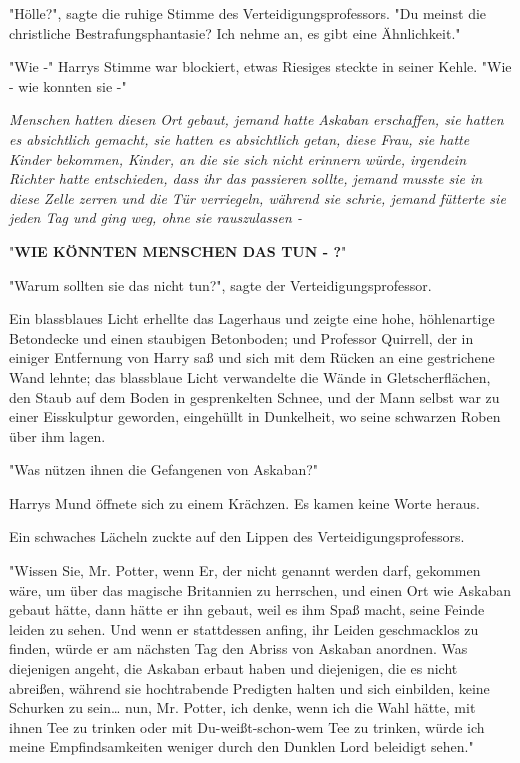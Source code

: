 {"Hölle?", sagte die ruhige Stimme des Verteidigungsprofessors. "Du meinst die christliche Bestrafungsphantasie? Ich nehme an, es gibt eine Ähnlichkeit."

"Wie -" Harrys Stimme war blockiert, etwas Riesiges steckte in seiner Kehle. "Wie - wie konnten sie -"

\emph{Menschen hatten diesen Ort gebaut, jemand hatte Askaban erschaffen, sie hatten es absichtlich gemacht, sie hatten es absichtlich getan, diese Frau, sie hatte Kinder bekommen, Kinder, an die sie sich nicht erinnern würde, irgendein Richter hatte} \emph{entschieden, dass ihr das passieren sollte, jemand musste sie in diese Zelle zerren und die Tür verriegeln, während sie schrie, jemand fütterte sie} \emph{jeden Tag und ging weg, ohne sie rauszulassen -}

"\textbf{WIE KÖNNTEN MENSCHEN DAS TUN - ?}"

"Warum sollten sie das nicht tun?", sagte der Verteidigungsprofessor.

Ein blassblaues Licht erhellte das Lagerhaus und zeigte eine hohe, höhlenartige Betondecke und einen staubigen Betonboden; und Professor Quirrell, der in einiger Entfernung von Harry saß und sich mit dem Rücken an eine gestrichene Wand lehnte; das blassblaue Licht verwandelte die Wände in Gletscherflächen, den Staub auf dem Boden in gesprenkelten Schnee, und der Mann selbst war zu einer Eisskulptur geworden, eingehüllt in Dunkelheit, wo seine schwarzen Roben über ihm lagen.

"Was nützen ihnen die Gefangenen von Askaban?"

Harrys Mund öffnete sich zu einem Krächzen. Es kamen keine Worte heraus.

Ein schwaches Lächeln zuckte auf den Lippen des Verteidigungsprofessors.

"Wissen Sie, Mr. Potter, wenn Er, der nicht genannt werden darf, gekommen wäre, um über das magische Britannien zu herrschen, und einen Ort wie Askaban gebaut hätte, dann hätte er ihn gebaut, weil es ihm Spaß macht, seine Feinde leiden zu sehen. Und wenn er stattdessen anfing, ihr Leiden geschmacklos zu finden, würde er am nächsten Tag den Abriss von Askaban anordnen. Was diejenigen angeht, die Askaban erbaut haben und diejenigen, die es nicht abreißen, während sie hochtrabende Predigten halten und sich einbilden, keine Schurken zu sein… nun, Mr. Potter, ich denke, wenn ich die Wahl hätte, mit ihnen Tee zu trinken oder mit Du-weißt-schon-wem Tee zu trinken, würde ich meine Empfindsamkeiten weniger durch den Dunklen Lord beleidigt sehen."

}
